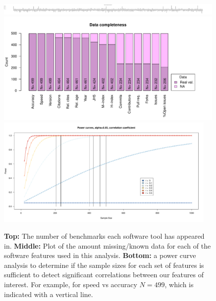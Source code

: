 \documentclass[fleqn,10pt]{SelfArx} %
\def\numTools{499}
\begin{document}

\clearpage
\newpage

\begin{figure}[H]
\centering
\includegraphics[width=0.99\textwidth]{numberBenchmarksPerToolBarplot.pdf}\\
\includegraphics[width=0.99\textwidth]{numberRealValueFeaturesBarplot.pdf}\\
\includegraphics[width=0.95\textwidth]{powerCurves.pdf}

\caption{ {\bf Top:} The number of benchmarks each software tool has appeared in. {\bf Middle:}
  Plot of the amount missing/known data for each of the software features used in this analysis. 
{\bf Bottom:} a power curve analysis to determine if the sample sizes for each set of features is sufficient to detect significant correlations between our features of interest. For example, for speed vs accuracy $N=\numTools$, which is indicated with a vertical line.    
}
\label{fig:numBenchmarks}
\end{figure}
\end{document}
